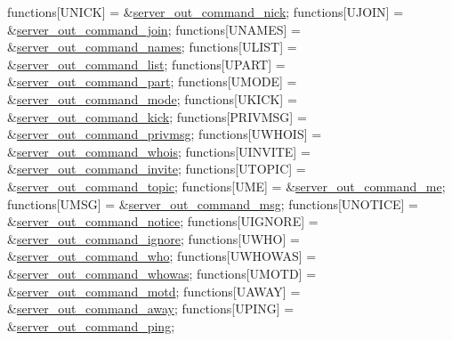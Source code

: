 \begin{DoxyCode}
functions[UNICK]      = &\hyperlink{G-2313-06-P2__client__function__handlers_8h_a43f3e63fcf23bd087e02911f79b789b0}{server\_out\_command\_nick};
functions[UJOIN]      = &\hyperlink{G-2313-06-P2__client__function__handlers_8h_a49e60d29aef3725ab2a91c7f99e61021}{server\_out\_command\_join};
functions[UNAMES]     = &\hyperlink{G-2313-06-P2__client__function__handlers_8h_ab2f3bd779063c27074a6cdce0f98ee0a}{server\_out\_command\_names};
functions[ULIST]      = &\hyperlink{G-2313-06-P2__client__function__handlers_8h_a0a66dad6908cd303ae31f06dda298e5f}{server\_out\_command\_list};
functions[UPART]      = &\hyperlink{G-2313-06-P2__client__function__handlers_8h_a39f81214b8394e2b7fb0989e5fe10fb3}{server\_out\_command\_part};
functions[UMODE]      = &\hyperlink{G-2313-06-P2__client__function__handlers_8h_afa583197101ff2eb07ab93ccd10da962}{server\_out\_command\_mode};
functions[UKICK]      = &\hyperlink{G-2313-06-P2__client__function__handlers_8h_a4e94d9864089e10109fc24ce92d4368b}{server\_out\_command\_kick};
functions[PRIVMSG]    = &\hyperlink{G-2313-06-P2__client__function__handlers_8h_a4c442d20949a3a3e84551a5f23ce8263}{server\_out\_command\_privmsg};
functions[UWHOIS]     = &\hyperlink{G-2313-06-P2__client__function__handlers_8h_af34c02fb3b13802e2c457a302c66cb89}{server\_out\_command\_whois};
functions[UINVITE]    = &\hyperlink{G-2313-06-P2__client__function__handlers_8h_a6760491bb5560bf6db1e652022f0720f}{server\_out\_command\_invite};
functions[UTOPIC]     = &\hyperlink{G-2313-06-P2__client__function__handlers_8h_affd97f456e87778153ec551468bb7f25}{server\_out\_command\_topic};
functions[UME]        = &\hyperlink{G-2313-06-P2__client__function__handlers_8h_a9680c711ecaa492727c14a9c5d7e82ca}{server\_out\_command\_me};
functions[UMSG]       = &\hyperlink{G-2313-06-P2__client__function__handlers_8h_ad2280719361affeaf8d3a663b48f0b3f}{server\_out\_command\_msg};
functions[UNOTICE]    = &\hyperlink{G-2313-06-P2__client__function__handlers_8h_a6e05dad9592e0e473e84647cfe263034}{server\_out\_command\_notice};
functions[UIGNORE]    = &\hyperlink{G-2313-06-P2__client__function__handlers_8h_a3b0bef634e60a6e59223cfb7e444fb36}{server\_out\_command\_ignore};
functions[UWHO]       = &\hyperlink{G-2313-06-P2__client__function__handlers_8h_a4f8f2db21b7edd9e6b7fbad232ee27fd}{server\_out\_command\_who};
functions[UWHOWAS]    = &\hyperlink{G-2313-06-P2__client__function__handlers_8h_a74f475c007446256a2cbada71f51f30a}{server\_out\_command\_whowas};
functions[UMOTD]      = &\hyperlink{G-2313-06-P2__client__function__handlers_8h_ae721ae6a65ec5f0790d6b6883dcf94a5}{server\_out\_command\_motd};
functions[UAWAY]      = &\hyperlink{G-2313-06-P2__client__function__handlers_8h_ac0c8a1e0d4144fd3d78c124bad9228d6}{server\_out\_command\_away};
functions[UPING]      = &\hyperlink{G-2313-06-P2__client__function__handlers_8h_a3719651e6671245a46f4994fcf462c7d}{server\_out\_command\_ping};
\end{DoxyCode}
 